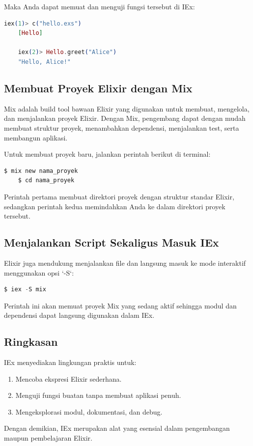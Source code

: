 Maka Anda dapat memuat dan menguji fungsi tersebut di IEx:

\begin{lstlisting}[language=Elixir]
	iex(1)> c("hello.exs")
	[Hello]
	
	iex(2)> Hello.greet("Alice")
	"Hello, Alice!"
\end{lstlisting}

\subsection{Membuat Proyek Elixir dengan Mix}

Mix adalah build tool bawaan Elixir yang digunakan untuk membuat, mengelola, dan menjalankan proyek Elixir. Dengan Mix, pengembang dapat dengan mudah membuat struktur proyek, menambahkan dependensi, menjalankan test, serta membangun aplikasi.

Untuk membuat proyek baru, jalankan perintah berikut di terminal:

\begin{lstlisting}[language=Elixir]
	$ mix new nama_proyek
	$ cd nama_proyek
\end{lstlisting}

Perintah pertama membuat direktori proyek dengan struktur standar Elixir, sedangkan perintah kedua memindahkan Anda ke dalam direktori proyek tersebut.

\subsection{Menjalankan Script Sekaligus Masuk IEx}
Elixir juga mendukung menjalankan file dan langsung masuk ke mode interaktif menggunakan opsi `-S`:

\begin{lstlisting}[language=Elixir]
	$ iex -S mix
\end{lstlisting}

Perintah ini akan memuat proyek Mix yang sedang aktif sehingga modul dan dependensi dapat langsung digunakan dalam IEx.

\subsection{Ringkasan}
IEx menyediakan lingkungan praktis untuk:
\begin{enumerate}
	\item Mencoba ekspresi Elixir sederhana.
	\item Menguji fungsi buatan tanpa membuat aplikasi penuh.
	\item Mengeksplorasi modul, dokumentasi, dan debug.
\end{enumerate}
Dengan demikian, IEx merupakan alat yang esensial dalam pengembangan maupun pembelajaran Elixir.



